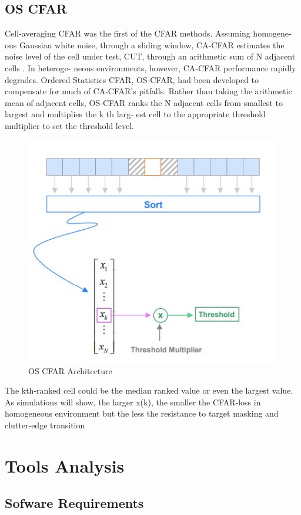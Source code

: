 \documentclass[10pt]{report}
\begin{document}
\section{OS CFAR}
Cell‐averaging CFAR was the first of the CFAR methods. Assuming homogene‐
ous Gaussian white noise, through a sliding window, CA‐CFAR estimates the noise level
of the cell under test, CUT, through an arithmetic sum of N adjacent cells . In heteroge‐
neous environments, however, CA‐CFAR performance rapidly degrades.
Ordered Statistics CFAR, OS‐CFAR, had been developed to compensate for
much of CA‐CFAR’s pitfalls. Rather than taking the arithmetic mean of adjacent cells,
OS‐CFAR ranks the N adjacent cells from smallest to largest and multiplies the k
th larg‐
est cell to the appropriate threshold multiplier to set the threshold level.
\begin{figure}[h]
	\centering
	\includegraphics[scale=1]{os.jpg}
	\caption{OS CFAR Architecture}
\end{figure}
The kth‐ranked cell could be the median ranked value or even the largest value. As simulations will show, the larger x(k), the smaller the CFAR‐loss in homogeneous environment but the less the resistance to target masking and clutter‐edge transition
 
\chapter {Tools Analysis}
\section{Sofware Requirements}
\end{document}
